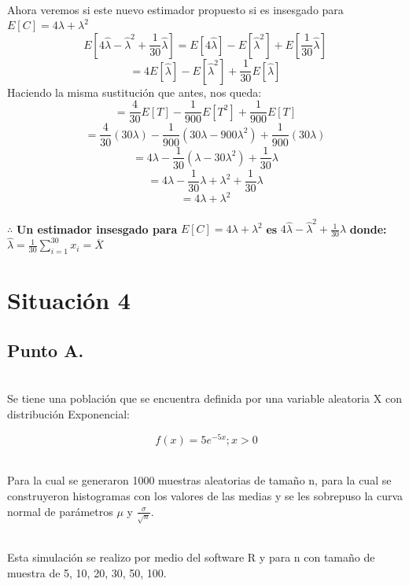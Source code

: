 \documentclass[letterpaper,12pt,onecolumn,titlepage]{article}
\begin{document}
~\\ Ahora veremos si este nuevo estimador propuesto si es insesgado para $E[C] = 4\lambda + {\lambda}^2$
$$E[4\hat{\lambda}-\hat{\lambda}^2+\frac{1}{30}\hat{\lambda}]=E[4\hat{\lambda}]-E[\hat{\lambda}^2]+E[\frac{1}{30}\hat{\lambda}]$$
$$=4E[\hat{\lambda}]-E[\hat{\lambda}^2]+\frac{1}{30}E[\hat{\lambda}]$$
Haciendo la misma sustituci\'{o}n que antes, nos queda:
$$=\frac{4}{30}E[T]-\frac{1}{900}E[T^2]+\frac{1}{900}E[T]$$
$$=\frac{4}{30}(30\lambda)-\frac{1}{900}(30\lambda-900{\lambda}^2)+\frac{1}{900}(30\lambda)$$
$$=4\lambda-\frac{1}{30}(\lambda-30{\lambda}^2)+\frac{1}{30}\lambda$$
$$=4\lambda-\frac{1}{30}\lambda+{\lambda}^2+\frac{1}{30}\lambda$$
$$=4\lambda+{\lambda}^2$$
~\\$\therefore$ \textbf{Un estimador insesgado para} $E[C]=4\lambda+{\lambda}^2$ \textbf{es} $4\hat{\lambda}-\hat{\lambda}^2+\frac{1}{30}\hat{\lambda}$ \textbf{donde:} $\hat{\lambda}=\frac{1}{30} \sum_{i=1}^{30}x_{i} = \overline{X}$

\pagebreak\section{Situaci\'{o}n 4}
\subsection{Punto A.}
~\\Se tiene una poblaci\'{o}n que se encuentra definida por una variable aleatoria X con distribuci\'{o}n Exponencial:

$$\ f(x)=5e^{-5x} ; x>0$$

~\\ Para la cual se generaron 1000 muestras aleatorias de tama\~{n}o n, para la cual se construyeron histogramas con los valores de las medias y se les sobrepuso la curva normal de par\'{a}metros $\mu$ y $\frac{\sigma}{\sqrt{n}}$. 

~\\ Esta simulaci\'{o}n se realizo por medio del software R y para n con tama\~{n}o de muestra de 5, 10, 20, 30, 50, 100.
\end{document}
